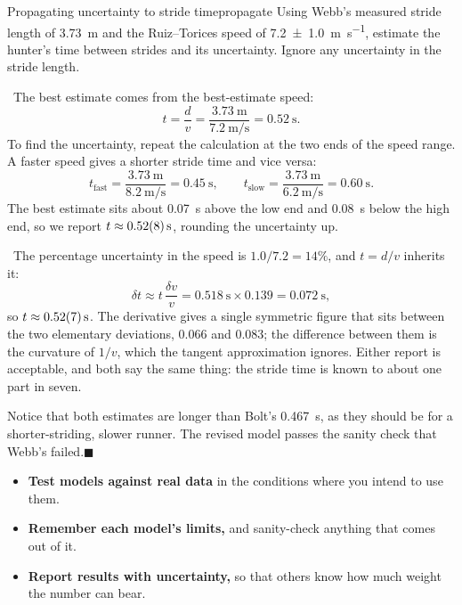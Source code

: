 \documentclass[11pt,twoside,openany]{book}
\newcounter{check}[chapter]
\newcommand{\viewtag}[3]{\fcolorbox{#2}{#3}{\footnotesize\textbf{\textcolor{#2}{#1}}}}
\newcommand{\elemtag}{\viewtag{Elementary}{elemcol}{elempale}}
\newcommand{\calctag}{\viewtag{Calculus}{calccol}{calcpale}}
\newcommand{\elem}{\par\medskip\noindent\elemtag\ }
\newcommand{\calc}{\par\medskip\noindent\calctag\ }
\newcommand{\qed}{\hfill$\blacksquare$}
\begin{document}
\begin{example}{Propagating uncertainty to stride time}{propagate}
Using Webb's measured stride length of \SI{3.73}{\metre} and the Ruiz--Torices speed of \SI{7.2 \pm 1.0}{\metre\per\second}, estimate the hunter's time between strides and its uncertainty. Ignore any uncertainty in the stride length.

\elem The best estimate comes from the best-estimate speed:
\[
t = \frac{d}{v} = \frac{\SI{3.73}{\metre}}{\SI{7.2}{\metre\per\second}} = \SI{0.52}{\second}.
\]
To find the uncertainty, repeat the calculation at the two ends of the speed range. A faster speed gives a shorter stride time and vice versa:
\[
t_{\text{fast}} = \frac{\SI{3.73}{\metre}}{\SI{8.2}{\metre\per\second}} = \SI{0.45}{\second},
\qquad
t_{\text{slow}} = \frac{\SI{3.73}{\metre}}{\SI{6.2}{\metre\per\second}} = \SI{0.60}{\second}.
\]
The best estimate sits about \SI{0.07}{\second} above the low end and \SI{0.08}{\second} below the high end, so we report $t \approx \SI{0.52 \pm 0.08}{\second}$, rounding the uncertainty up.

\calc The percentage uncertainty in the speed is $1.0/7.2 = 14\%$, and $t = d/v$ inherits it:
\[
\delta t \approx t\,\frac{\delta v}{v} = \SI{0.518}{\second}\times 0.139 = \SI{0.072}{\second},
\]
so $t \approx \SI{0.52 \pm 0.07}{\second}$. The derivative gives a single symmetric figure that sits between the two elementary deviations, \num{0.066} and \num{0.083}; the difference between them is the curvature of $1/v$, which the tangent approximation ignores. Either report is acceptable, and both say the same thing: the stride time is known to about one part in seven.

\smallskip\noindent Notice that both estimates are longer than Bolt's \SI{0.467}{\second}, as they should be for a shorter-striding, slower runner. The revised model passes the sanity check that Webb's failed.\qed
\end{example}

\begin{keyidea}
\begin{itemize}[itemsep=2pt]
  \item \textbf{Test models against real data} in the conditions where you intend to use them.
  \item \textbf{Remember each model's limits,} and sanity-check anything that comes out of it.
  \item \textbf{Report results with uncertainty,} so that others know how much weight the number can bear.
\end{itemize}
\end{keyidea}
\end{document}
